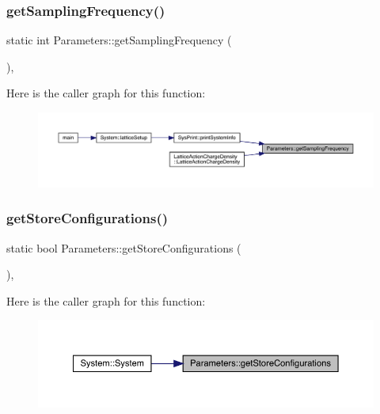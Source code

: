 \subsubsection{\texorpdfstring{getSamplingFrequency()}{getSamplingFrequency()}}
{\footnotesize\ttfamily static int Parameters\+::get\+Sampling\+Frequency (\begin{DoxyParamCaption}{ }\end{DoxyParamCaption})\hspace{0.3cm}{\ttfamily [inline]}, {\ttfamily [static]}}

Here is the caller graph for this function\+:\nopagebreak
\begin{figure}[H]
\begin{center}
\leavevmode
\includegraphics[width=350pt]{class_parameters_a3b4e197b2569fb5465e0827430e45eb5_icgraph}
\end{center}
\end{figure}
\mbox{\label{class_parameters_a38f06b562355b56a1b1222e1cfe6735a}} 
\subsubsection{\texorpdfstring{getStoreConfigurations()}{getStoreConfigurations()}}
{\footnotesize\ttfamily static bool Parameters\+::get\+Store\+Configurations (\begin{DoxyParamCaption}{ }\end{DoxyParamCaption})\hspace{0.3cm}{\ttfamily [inline]}, {\ttfamily [static]}}

Here is the caller graph for this function\+:\nopagebreak
\begin{figure}[H]
\begin{center}
\leavevmode
\includegraphics[width=350pt]{class_parameters_a38f06b562355b56a1b1222e1cfe6735a_icgraph}
\end{center}
\end{figure}
\mbox{\label{class_parameters_a216f85b3c5980a33f8a54c42fb3575c7}} 
